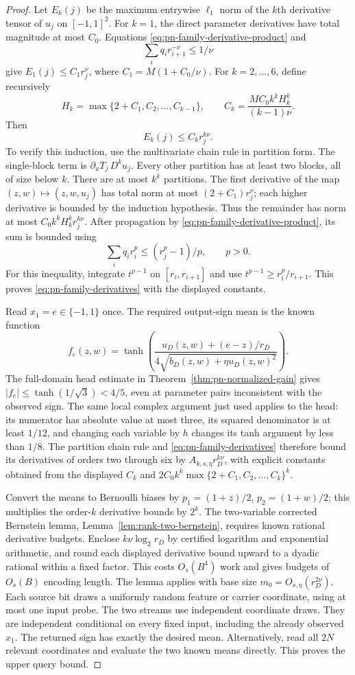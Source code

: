 \begin{proof}
Let $E_k(j)$ be the maximum entrywise $\ell_1$ norm of the
$k$th derivative tensor of $u_j$ on $[-1,1]^2$. For $k=1$,
the direct parameter derivatives have total magnitude at most
$C_0$. Equations \eqref{eq:pn-family-derivative-product} and
\[
 \sum_iq_i r_{i+1}^{-\nu}\le1/\nu
\]
give $E_1(j)\le C_1r_j^\nu$, where
$C_1=M(1+C_0/\nu)$.
For $k=2,\ldots,6$, define recursively
\[
 H_k=\max\{2+C_1,C_2,\ldots,C_{k-1}\},\qquad
 C_k=\frac{M C_0 k^k H_k^k}{(k-1)\nu}.
\]
Then
\begin{equation}
 E_k(j)\le C_k r_j^{k\nu}.
 \label{eq:pn-family-derivatives}
\end{equation}
To verify this induction, use the multivariate chain rule in
partition form. The single-block term is
$\partial_uT_j\,D^ku_j$. Every other partition has at least
two blocks, all of size below $k$. There are at most $k^k$
partitions. The first derivative of the map
$(z,w)\mapsto(z,w,u_j)$ has total norm at most
$(2+C_1)r_j^\nu$; each higher derivative is bounded by the
induction hypothesis. Thus the remainder has norm at most
$C_0 k^kH_k^k r_j^{k\nu}$.
After propagation by \eqref{eq:pn-family-derivative-product},
its sum is bounded using
\[
 \sum_i q_i r_i^p\le(r_j^p-1)/p,
 \qquad p>0.
\]
For this inequality, integrate $t^{p-1}$ on
$[r_i,r_{i+1}]$ and use
$t^{p-1}\ge r_i^p/r_{i+1}$. This proves
\eqref{eq:pn-family-derivatives} with the displayed constants.

Read $x_1=e\in\{-1,1\}$ once. The required output-sign mean is
the known function
\[
 f_e(z,w)=\tanh\!\left(
 \frac{u_D(z,w)+(e-z)/r_D}
 {4\sqrt{b_D(z,w)+\eta u_D(z,w)^2}}\right).
\]
The full-domain head estimate in
Theorem~\ref{thm:pn-normalized-gain} gives
$|f_e|\le\tanh(1/\sqrt3)<4/5$, even at parameter pairs
inconsistent with the observed sign. The same local complex
argument just used applies to the head: its numerator has
absolute value at most three, its squared denominator is at
least $1/12$, and changing each variable by $h$ changes its
tanh argument by less than $1/8$.
The partition chain rule and \eqref{eq:pn-family-derivatives}
therefore bound its derivatives of orders two through six by
$A_{k,s,\eta}r_D^{k\nu}$, with explicit constants obtained
from the displayed $C_k$ and $2C_0 k^k
\max\{2+C_1,C_2,\ldots,C_k\}^k$.

Convert the means to Bernoulli biases by
$p_1=(1+z)/2$, $p_2=(1+w)/2$; this multiplies the order-$k$
derivative bounds by $2^k$. The two-variable corrected Bernstein
lemma, Lemma~\ref{lem:rank-two-bernstein}, requires known rational
derivative budgets. Enclose
$k\nu\log_2 r_D$ by certified logarithm and exponential
arithmetic, and round each displayed derivative bound upward
to a dyadic rational within a fixed factor. This costs
$O_s(B^4)$ work and gives budgets of $O_s(B)$ encoding length.
The lemma applies with base size $m_0=O_{s,\eta}(r_D^{2\nu})$.
Each source bit draws a uniformly random feature or carrier
coordinate, using at most one input probe. The two streams use
independent coordinate draws. They are independent conditional
on every fixed input, including the already observed $x_1$.
The returned sign has exactly the desired mean. Alternatively,
read all $2N$ relevant coordinates and evaluate the two known
means directly. This proves the upper query bound.


\end{proof}
